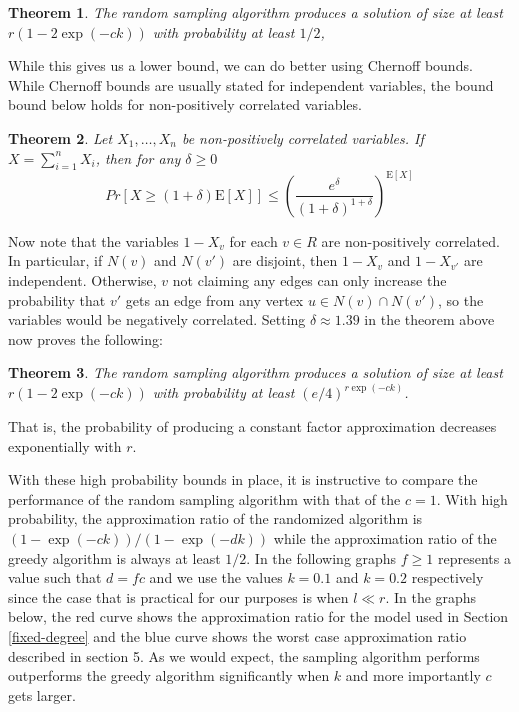 \documentclass[]{article}
\newcommand{\E}{\text{E}}
\newtheorem{thm}{Theorem}
\begin{document}
\begin{thm}
The random sampling algorithm produces a solution of size at least $r(1-2\exp(-ck))$ with probability at least $1/2$, 
\end{thm}

While this gives us a lower bound, we can do better using Chernoff
bounds. While Chernoff bounds are usually stated for independent
variables, the bound bound below holds for non-positively correlated
variables.

\begin{thm}
Let $X_1,\ldots, X_n$ be non-positively correlated variables. If $X=\sum_{i=1}^n X_i$, then for any $\delta\geq 0$
\[ Pr[X \geq (1+\delta)\E[X] ] \leq \left(\frac{e^\delta}{(1+\delta)^{1+\delta}}\right)^{\E[X]} \]
\end{thm}

Now note that the variables $1-X_v$ for each $v\in R$ are
non-positively correlated. In particular, if $N(v)$ and $N(v')$ are
disjoint, then $1-X_v$ and $1-X_{v'}$ are independent. Otherwise, $v$
not claiming any edges can only increase the probability that $v'$
gets an edge from any vertex $u\in N(v)\cap N(v')$, so the variables
would be negatively correlated. Setting $\delta\approx 1.39$ in the
theorem above now proves the following:

\begin{thm}
The random sampling algorithm produces a solution of size at least $r(1-2\exp(-ck))$ with probability at least $(e/4)^{r\exp(-ck)}$.
\end{thm}

That is, the probability of producing a constant factor approximation decreases exponentially with $r$.

With these high probability bounds in place, it is instructive to
compare the performance of the random sampling algorithm with that of
the $c=1$. With high probability, the approximation ratio of the
randomized algorithm is $(1-\exp(-ck))/(1-\exp(-dk))$ while the
approximation ratio of the greedy algorithm is always at least
$1/2$. In the following graphs $f\geq 1$ represents a value such that
$d=fc$ and we use the values $k=0.1$ and $k=0.2$ respectively since
the case that is practical for our purposes is when $l \ll r$. In the
graphs below, the red curve shows the approximation ratio for the
model used in Section \ref{fixed-degree} and the blue curve shows the
worst case approximation ratio described in section 5. As we would
expect, the sampling algorithm performs outperforms the greedy
algorithm significantly when $k$ and more importantly $c$ gets larger.
\end{document}

